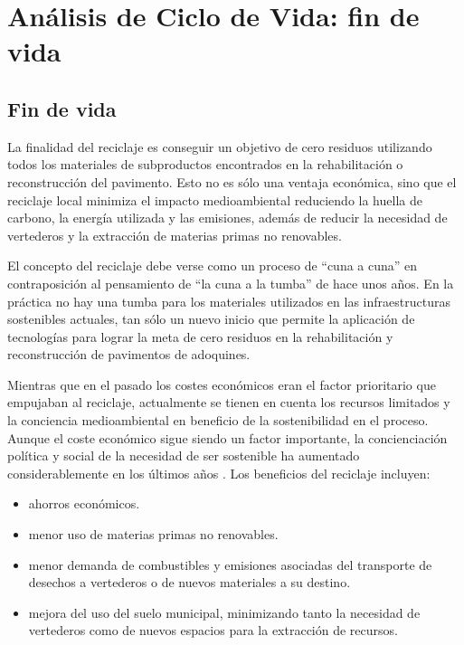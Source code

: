 \chapter{Análisis de Ciclo de Vida: fin de vida}
\section{Fin de vida}

La finalidad del reciclaje es conseguir un objetivo de cero residuos utilizando todos los materiales de subproductos encontrados en la rehabilitación o reconstrucción del pavimento. Esto no es sólo una ventaja económica, sino que el reciclaje local minimiza el impacto medioambiental reduciendo la huella de carbono, la energía utilizada y las emisiones, además de reducir la necesidad de vertederos y la extracción de materias primas no renovables.

El concepto del reciclaje debe verse como un proceso de ``cuna a cuna'' en contraposición al pensamiento de ``la cuna a la tumba'' de hace unos años. En la práctica no hay una tumba para los materiales utilizados en las infraestructuras sostenibles actuales, tan sólo un nuevo inicio que permite la aplicación de tecnologías para lograr la meta de cero residuos en la rehabilitación y reconstrucción de pavimentos de adoquines.

Mientras que en el pasado los costes económicos eran el factor prioritario que empujaban al reciclaje, actualmente se tienen en cuenta los recursos limitados y la conciencia medioambiental en beneficio de la sostenibilidad en el proceso. Aunque el coste económico sigue siendo un factor importante, la concienciación política y social de la necesidad de ser sostenible ha aumentado considerablemente en los últimos años \cite{sustpave}. Los beneficios del reciclaje incluyen:

\begin{itemize}
  \item ahorros económicos.
  \item menor uso de materias primas no renovables.
  \item menor demanda de combustibles y emisiones asociadas del transporte de desechos a vertederos o de nuevos materiales a su destino.
  \item mejora del uso del suelo municipal, minimizando tanto la necesidad de vertederos como de nuevos espacios para la extracción de recursos.
\end{itemize}

